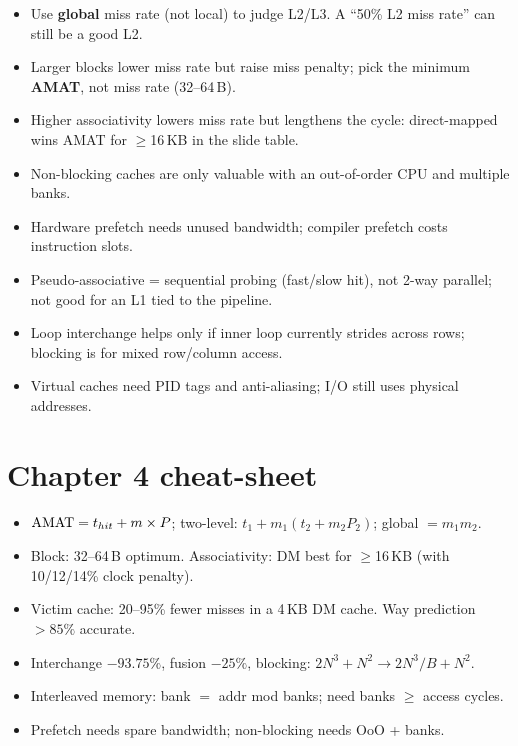 \begin{trap}
\begin{itemize}
\item Use \textbf{global} miss rate (not local) to judge L2/L3. A ``50\% L2 miss rate'' can still be a good L2.
\item Larger blocks lower miss rate but raise miss penalty; pick the minimum \textbf{AMAT}, not miss rate (32--64\,B).
\item Higher associativity lowers miss rate but lengthens the cycle: direct-mapped wins AMAT for $\ge$16\,KB in the slide table.
\item Non-blocking caches are only valuable with an out-of-order CPU and multiple banks.
\item Hardware prefetch needs unused bandwidth; compiler prefetch costs instruction slots.
\item Pseudo-associative = sequential probing (fast/slow hit), not 2-way parallel; not good for an L1 tied to the pipeline.
\item Loop interchange helps only if inner loop currently strides across rows; blocking is for mixed row/column access.
\item Virtual caches need PID tags and anti-aliasing; I/O still uses physical addresses.
\end{itemize}
\end{trap}

\section{Chapter 4 cheat-sheet}
\begin{key}
\begin{itemize}
\item $\mathrm{AMAT}=t_{hit}+m\times P$; two-level: $t_1+m_1(t_2+m_2P_2)$; global $=m_1m_2$.
\item Block: 32--64\,B optimum. Associativity: DM best for $\ge$16\,KB (with 10/12/14\% clock penalty).
\item Victim cache: 20--95\% fewer misses in a 4\,KB DM cache. Way prediction $>85\%$ accurate.
\item Interchange $-93.75\%$, fusion $-25\%$, blocking: $2N^3+N^2\to2N^3/B+N^2$.
\item Interleaved memory: bank $=$ addr mod banks; need banks $\ge$ access cycles.
\item Prefetch needs spare bandwidth; non-blocking needs OoO + banks.
\end{itemize}
\end{key}
